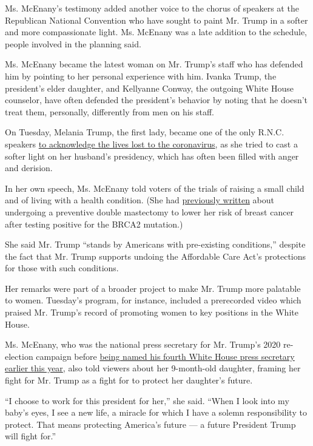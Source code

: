 Ms. McEnany's testimony added another voice to the chorus of speakers at
the Republican National Convention who have sought to paint Mr. Trump in
a softer and more compassionate light. Ms. McEnany was a late addition
to the schedule, people involved in the planning said.

Ms. McEnany became the latest woman on Mr. Trump's staff who has
defended him by pointing to her personal experience with him. Ivanka
Trump, the president's elder daughter, and Kellyanne Conway, the
outgoing White House counselor, have often defended the president's
behavior by noting that he doesn't treat them, personally, differently
from men on his staff.

On Tuesday, Melania Trump, the first lady, became one of the only R.N.C.
speakers
\href{https://www.nytimes3xbfgragh.onion/2020/08/25/us/politics/melania-trump.html}{to
acknowledge the lives lost to the coronavirus}, as she tried to cast a
softer light on her husband's presidency, which has often been filled
with anger and derision.

In her own speech, Ms. McEnany told voters of the trials of raising a
small child and of living with a health condition. (She had
\href{https://www.foxnews.com/opinion/kayleigh-mcenany-preventative-double-mastectomy-age-30}{previously
written} about undergoing a preventive double mastectomy to lower her
risk of breast cancer after testing positive for the BRCA2 mutation.)

She said Mr. Trump ``stands by Americans with pre-existing conditions,''
despite the fact that Mr. Trump supports undoing the Affordable Care
Act's protections for those with such conditions.

Her remarks were part of a broader project to make Mr. Trump more
palatable to women. Tuesday's program, for instance, included a
prerecorded video which praised Mr. Trump's record of promoting women to
key positions in the White House.

Ms. McEnany, who was the national press secretary for Mr. Trump's 2020
re-election campaign before
\href{https://www.nytimes3xbfgragh.onion/2020/04/07/us/politics/kayleigh-mcenany-stephanie-grisham-trump.html}{being
named his fourth White House press secretary earlier this year}, also
told viewers about her 9-month-old daughter, framing her fight for Mr.
Trump as a fight for to protect her daughter's future.

``I choose to work for this president for her,'' she said. ``When I look
into my baby's eyes, I see a new life, a miracle for which I have a
solemn responsibility to protect. That means protecting America's future
--- a future President Trump will fight for.''

